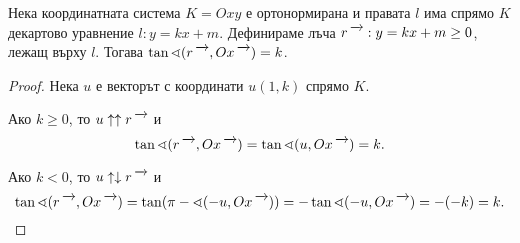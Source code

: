 \documentclass{../../common/topic}
\begin{document}
\begin{proposition}
  Нека координатната система \( K = Oxy \) е ортонормирана и правата \( l \) има спрямо \( K \) декартово уравнение \( l: y = kx + m \). Дефинираме лъча \( \ray{r} : y = kx + m \geq 0 \), лежащ върху \( l \). Тогава \( \tan \sphericalangle(\ray{r}, \ray{Ox}) = k \).
\end{proposition}
\begin{proof}
  Нека \( u \) е векторът с координати \( u(1, k) \) спрямо \( K \).

  Ако \( k \geq 0 \), то \( u \uparrow\uparrow \ray{r} \) и
  \begin{equation*}
     \tan \sphericalangle(\ray{r}, \ray{Ox}) = \tan \sphericalangle(u, \ray{Ox}) = k.
  \end{equation*}

  Ако \( k < 0 \), то \( u \uparrow\downarrow \ray{r} \) и
  \begin{equation*}
    \tan \sphericalangle(\ray{r}, \ray{Ox}) = \tan(\pi - \sphericalangle(-u, \ray{Ox})) = -\tan \sphericalangle(-u, \ray{Ox}) = -(-k) = k.
  \end{equation*}
\end{proof}
\end{document}

